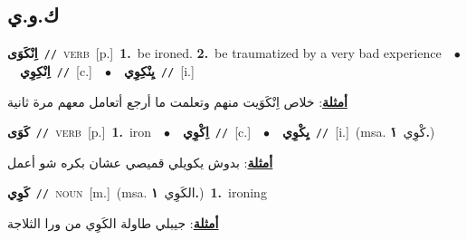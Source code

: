 \documentclass[10pt,a4paper,twoside]{article} %
\begin{document}
\begin{multicols}{2}
\vspace{-3mm}
\subsection*{\color{blue}\foreignlanguage{arabic}{ك.و.ي}\color{blue}{}} 

{\setlength\topsep{0pt}\textbf{\foreignlanguage{arabic}{اِنْكَوَى}}\ {\color{gray}\texttt{//}\color{black}}\ \textsc{verb}\ [p.]\ \textbf{1.}~be ironed.  \textbf{2.}~be traumatized by a very bad experience\ \ $\bullet$\ \ \setlength\topsep{0pt}\textbf{\foreignlanguage{arabic}{اِنْكِوِي}}\ {\color{gray}\texttt{//}\color{black}}\ [c.]\ \ $\bullet$\ \ \setlength\topsep{0pt}\textbf{\foreignlanguage{arabic}{يِنْكِوِي}}\ {\color{gray}\texttt{//}\color{black}}\ [i.]\  \begin{flushright}\color{gray}\foreignlanguage{arabic}{\textbf{\underline{\foreignlanguage{arabic}{أمثلة}}}: خلاص اِنْكَوَيت منهم وتعلمت ما أرجع أتعامل معهم مرة ثانية}\end{flushright}\color{black}} \vspace{2mm}

{\setlength\topsep{0pt}\textbf{\foreignlanguage{arabic}{كَوَى}}\ {\color{gray}\texttt{//}\color{black}}\ \textsc{verb}\ [p.]\ \textbf{1.}~iron\ \ $\bullet$\ \ \setlength\topsep{0pt}\textbf{\foreignlanguage{arabic}{اِكْوِي}}\ {\color{gray}\texttt{//}\color{black}}\ [c.]\ \ $\bullet$\ \ \setlength\topsep{0pt}\textbf{\foreignlanguage{arabic}{يِكْوِي}}\ {\color{gray}\texttt{//}\color{black}}\ [i.]\ \color{gray}(msa. \foreignlanguage{arabic}{َكْوِي}~\foreignlanguage{arabic}{\textbf{١.}})\color{black}\  \begin{flushright}\color{gray}\foreignlanguage{arabic}{\textbf{\underline{\foreignlanguage{arabic}{أمثلة}}}: بدوش يكويلي قميصي عشان بكره شو أعمل}\end{flushright}\color{black}} \vspace{2mm}

{\setlength\topsep{0pt}\textbf{\foreignlanguage{arabic}{كَوِي}}\ {\color{gray}\texttt{//}\color{black}}\ \textsc{noun}\ [m.]\ \color{gray}(msa. \foreignlanguage{arabic}{الكَوِي}~\foreignlanguage{arabic}{\textbf{١.}})\color{black}\ \textbf{1.}~ironing\  \begin{flushright}\color{gray}\foreignlanguage{arabic}{\textbf{\underline{\foreignlanguage{arabic}{أمثلة}}}: جيبلي طاولة الكَوِي من ورا الثلاجة}\end{flushright}\color{black}} \vspace{2mm}


\end{multicols}
\end{document}
